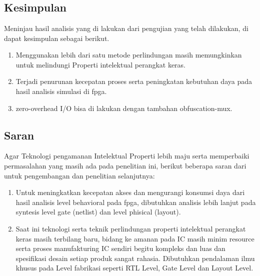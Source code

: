 % 

\chapter{\kesimpulan}

% 

\section{Kesimpulan}
Meninjau hasil analisis yang di lakukan dari pengujian yang telah dilakukan, di dapat kesimpulan sebagai berikut.

\begin{enumerate}	
	\item Menggunakan lebih dari satu metode perlindungan masih memungkinkan untuk melindungi Properti intelektual perangkat keras.
	
	\item Terjadi penurunan kecepatan proses serta peningkatan kebutuhan daya pada hasil analisis simulasi di fpga.
	
	\item zero-overhead I/O bisa di lakukan dengan tambahan obfuscation-mux.
\end{enumerate}

% 

\section{Saran}
Agar Teknologi pengamanan Intelektual Properti lebih maju serta memperbaiki permasalahan yang masih ada pada penelitian ini, berikut beberapa saran dari untuk pengembangan dan penelitian selanjutnya:

\begin{enumerate}
	\item Untuk meningkatkan kecepatan akses dan mengurangi konsumsi daya dari hasil analisis level behavioral pada fpga, dibutuhkan analisis lebih lanjut pada syntesis level gate (netlist) dan level phisical (layout).
	
	\item Saat ini teknologi serta teknik perlindungan properti intelektual perangkat keras masih terbilang baru, bidang ke amanan pada IC masih minim resource serta proses manufakturing IC sendiri begitu kompleks dan luas dan spesifikasi desain setiap produk sangat rahasia. Dibutuhkan pendalaman ilmu khusus pada Level fabrikasi seperti RTL Level, Gate Level dan Layout Level.
\end{enumerate}
